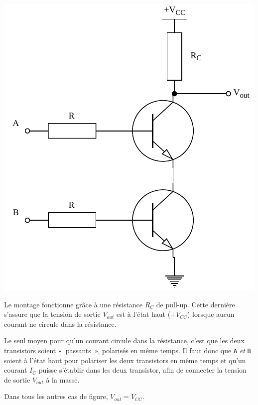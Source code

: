 \documentclass{../../template/tp}
\begin{document}
{
    \begin{center}
        \includegraphics[]{NAND.pdf}
    \end{center}
    Le montage fonctionne grâce à une résistance $R_C$ de pull-up. Cette dernière s'assure que la tension de sortie $V_{out}$ est à l'état haut ($+ V_{CC}$) lorsque aucun courant ne circule dans la résistance.

    Le seul moyen pour qu'un courant circule dans la résistance, c'est que les deux transistors soient «~passants~», polarisés en même temps. Il faut donc que \texttt{A} \textit{et} \texttt{B} soient à l'état haut pour polariser les deux transistors en même temps et qu'un courant $I_C$ puisse s'établir dans les deux transistor, afin de connecter la tension de sortie $V_{out}$ à la masse.

    Dans tous les autres cas de figure, $V_{out} = V_{CC}$.

}





\end{document}
